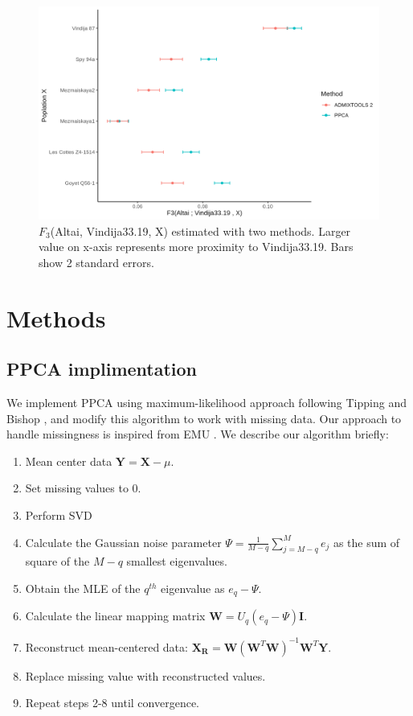 \documentclass[12pt, letterpaper]{article}
\newcommand{\BY}{\mathbf{Y}}
\newcommand{\BW}{\mathbf{W}}
\newcommand{\BI}{\mathbf{I}}
\newcommand{\MX}{\mathbf{X}}
\begin{document}
\begin{figure}[ht!]
    \includegraphics[width=16.5cm]{plots/f3_neandertal.png}
    \centering
    \caption{$F_3$(Altai, Vindija33.19, X) estimated with two methods. Larger value on x-axis represents more proximity to Vindija33.19. Bars show 2 standard errors.}
    \label{fig:nea_f3}
\end{figure}

\section{Methods}

\subsection{PPCA implimentation}\label{method-ppca}

We implement PPCA using maximum-likelihood approach following Tipping and                Bishop \cite{tipping_probabilistic_1999-1}, and modify this algorithm to work with missing data. Our approach to handle missingness is inspired from EMU \cite{meisner_large-scale_2021}. We describe our algorithm briefly:
\begin{enumerate}
    \item Mean center data $\BY = \MX - \mu$.
    \item Set missing values to 0.
    \item Perform SVD
    \item Calculate the Gaussian noise parameter $\Psi = \frac{1}{M-q} \sum_{j=M-q}^ M e_j$ as the sum of square of the $M-q$ smallest eigenvalues.
    \item Obtain the MLE of the $q^{th}$ eigenvalue as $e_q - \Psi$.
    \item Calculate the linear mapping matrix $\BW = U_q (e_q - \Psi)\BI$.
    \item Reconstruct mean-centered data: $\mathbf{X_R} = \BW(\BW^T\BW)^{-1}\BW^T\BY$.
    \item Replace missing value with reconstructed values.
    \item Repeat steps 2-8 until convergence.
\end{enumerate}
\end{document}
